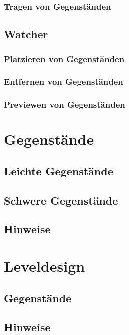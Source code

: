 \subsubsection{Tragen von Gegenständen}

\subsection{Watcher}

\subsubsection{Platzieren von Gegenständen}

\subsubsection{Entfernen von Gegenständen}

\subsubsection{Previewen von Gegenständen}

\section{Gegenstände}

\subsection{Leichte Gegenstände}

\subsection{Schwere Gegenstände}

\subsection{Hinweise}

\section{Leveldesign}

\subsection{Gegenstände}

\subsection{Hinweise}


